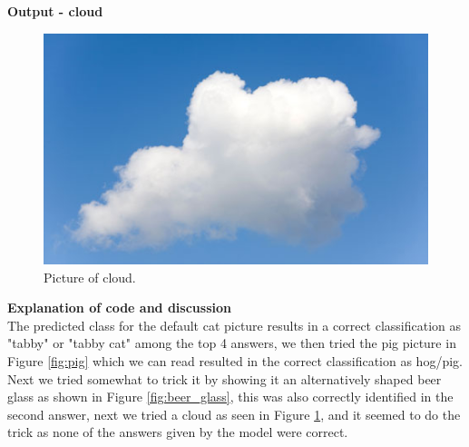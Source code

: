 \documentclass{article}
\begin{document}
\textbf{Output - cloud}
\begin{figure}[h!]
\begin{center}
\caption{Picture of cloud.}
\label{fig:cloud}
\includegraphics[scale=0.5]{"../Lesson 10/images/cloud"}
\end{center}
\end{figure}
\textbf{Explanation of code and discussion}\\

The predicted class for the default cat picture results in a correct classification as "tabby" or "tabby cat" among the top 4 answers, we then tried the pig picture in Figure \ref{fig:pig} which we can read resulted in the correct classification as hog/pig. Next we tried somewhat to trick it by showing it an alternatively shaped beer glass as shown in Figure \ref{fig:beer_glass}, this was also correctly identified in the second answer, next we tried a cloud as seen in Figure \ref{fig:cloud}, and it seemed to do the trick as none of the answers given by the model were correct.
\end{document}
